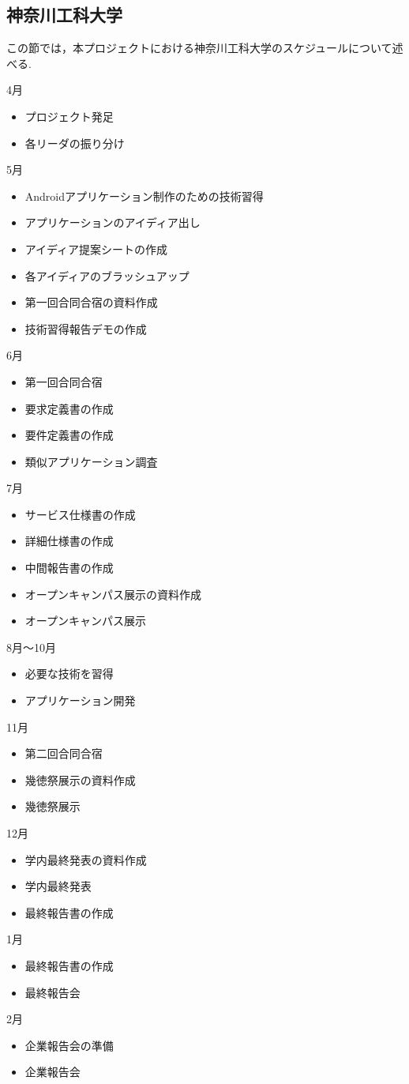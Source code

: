\subsection{神奈川工科大学}
\par この節では，本プロジェクトにおける神奈川工科大学のスケジュールについて述べる.

4月
\begin{itemize}
\item プロジェクト発足
\item 各リーダの振り分け
\end{itemize}
5月
\begin{itemize}
\item Androidアプリケーション制作のための技術習得
\item アプリケーションのアイディア出し
\item アイディア提案シートの作成
\item 各アイディアのブラッシュアップ
\item 第一回合同合宿の資料作成
\item 技術習得報告デモの作成
\end{itemize}
6月
\begin{itemize}
\item 第一回合同合宿
\item 要求定義書の作成
\item 要件定義書の作成
\item 類似アプリケーション調査
\end{itemize}
7月
\begin{itemize}
\item サービス仕様書の作成
\item 詳細仕様書の作成
\item 中間報告書の作成
\item オープンキャンパス展示の資料作成
\item オープンキャンパス展示
\end{itemize}
8月～10月
\begin{itemize}
\item 必要な技術を習得
\item アプリケーション開発
\end{itemize}
11月
\begin{itemize}
\item 第二回合同合宿
\item 幾徳祭展示の資料作成
\item 幾徳祭展示
\end{itemize}
12月
\begin{itemize}
\item 学内最終発表の資料作成
\item 学内最終発表
\item 最終報告書の作成
\end{itemize}
1月
\begin{itemize}
\item 最終報告書の作成
\item 最終報告会
\end{itemize}
2月
\begin{itemize}
\item 企業報告会の準備
\item 企業報告会
\end{itemize}
